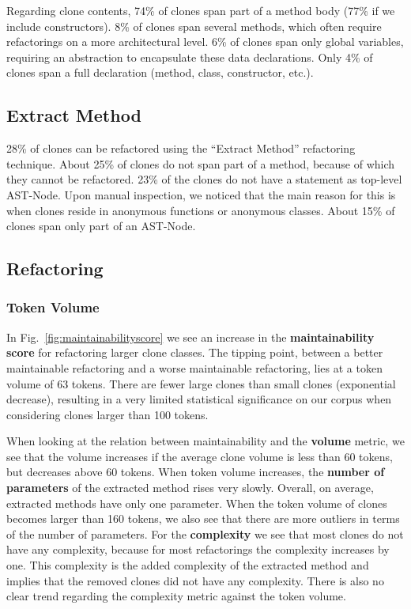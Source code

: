 Regarding clone contents, 74\% of clones span part of a method body (77\% if we include constructors). 8\% of clones span several methods, which often require refactorings on a more architectural level. 6\% of clones span only global variables, requiring an abstraction to encapsulate these data declarations. Only 4\% of clones span a full declaration (method, class, constructor, etc.).

\subsection{Extract Method}
28\% of clones can be refactored using the ``Extract Method'' refactoring technique. About 25\% of clones do not span part of a method, because of which they cannot be refactored. 23\% of the clones do not have a statement as top-level AST-Node. Upon manual inspection, we noticed that the main reason for this is when clones reside in anonymous functions or anonymous classes. About 15\% of clones span only part of an AST-Node.

\subsection{Refactoring}

\subsubsection{Token Volume}
In Fig.~\ref{fig:maintainabilityscore} we see an increase in the \textbf{maintainability score} for refactoring larger clone classes. The tipping point, between a better maintainable refactoring and a worse maintainable refactoring, lies at a token volume of 63 tokens. There are fewer large clones than small clones (exponential decrease), resulting in a very limited statistical significance on our corpus when considering clones larger than 100 tokens.

When looking at the relation between maintainability and the \textbf{volume} metric, we see that the volume increases if the average clone volume is less than 60 tokens, but decreases above 60 tokens. When token volume increases, the \textbf{number of parameters} of the extracted method rises very slowly. Overall, on average, extracted methods have only one parameter. When the token volume of clones becomes larger than 160 tokens, we also see that there are more outliers in terms of the number of parameters. For the \textbf{complexity} we see that most clones do not have any complexity, because for most refactorings the complexity increases by one. This complexity is the added complexity of the extracted method and implies that the removed clones did not have any complexity. There is also no clear trend regarding the complexity metric against the token volume.

